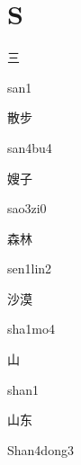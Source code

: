 ﻿%
\section*{S}
\begin{multicols*}{2}

\begin{verbete}[san1]{三}
\begin{pronuncia}{san1}
\end{pronuncia}
\end{verbete}

\begin{verbete}[san4bu4]{散步}
\begin{pronuncia}{san4bu4}
\end{pronuncia}
\end{verbete}

\begin{verbete}[sao3zi0]{嫂子}
\begin{pronuncia}{sao3zi0}
\end{pronuncia}
\end{verbete}

\begin{verbete}{森林}
\begin{pronuncia}{sen1lin2}
\end{pronuncia}
\end{verbete}

\begin{verbete}[sha1mo4]{沙漠}
\begin{pronuncia}{sha1mo4}
\end{pronuncia}
\end{verbete}

\begin{verbete}[shan1]{山}
\begin{pronuncia}{shan1}
\end{pronuncia}
\end{verbete}

\begin{verbete}{山东}
\begin{pronuncia}{Shan4dong3}
\end{pronuncia}
\end{verbete}


\end{multicols*}
